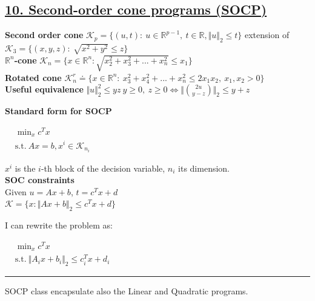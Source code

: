 \documentclass[a4paper]{article}
\begin{document}
\subsection*{\underline{10. Second-order cone programs (SOCP)}}
\textbf{Second order cone} $\mathcal{K}_p=\{(u,t): \ u\in\mathbb{R}^{p-1}, \ t\in\mathbb{R}, \Vert u \Vert_2\le{t}\}$ extension of 
$\mathcal{K}_3=\{(x,y,z): \ \sqrt{x^2+y^2}\le{z}\}$\\
\textbf{$\mathbb{R}^n$-cone} $\mathcal{K}_n =\{x\in\mathbb{R}^n: \sqrt{x_2^2+x_3^2+...+x_n^2}\le{x_1}\}$\\
\textbf{Rotated cone} 
$\mathcal{K}_n^r\doteq\{x\in\mathbb{R}^n: \ x_3^2+x_4^2+...+x_n^2\le2x_1{x_2}, \ x_1, x_2 >0\}$\\
\textbf{Useful equivalence} $\Vert u \Vert_2^2 \le yz \ y\ge0, \ z\ge0 \iff \Vert \binom{2u}{y-z} \Vert_2 \le y+z$
\begin{multicols}{3}
    \noindent
    \textbf{Standard form for SOCP}
    \begin{center}
        $\begin{aligned}
            &\min_{x} c^T{x}\\
            &\text{s.t.} \ Ax=b, x^i \in \mathcal{K}_{n_i}
        \end{aligned}$
    \end{center}
    $x^i$ is the $i$-th block of the decision variable, $n_i$ its dimension.
    \newcolumn\\
    \textbf{SOC constraints}\\
    Given $u= Ax+b$, $t=c^T{x}+d$\\

    $\mathcal{K}=\{x: \Vert Ax+b \Vert_2 \le c^T{x}+d\}$
    \begin{center}
    \end{center}
    \newcolumn
    I can rewrite the problem as:
    \begin{center}
        $\begin{aligned}
            &\min_{x} {c^T{x}}\\
            &\text{s.t.} \ \Vert A_i{x}+b_i \Vert_2 \le c_i^T{x}+d_i
        \end{aligned}$
    \end{center}
    \hrule
    SOCP class encapsulate also the Linear and Quadratic programs.
\end{multicols}
\end{document}
